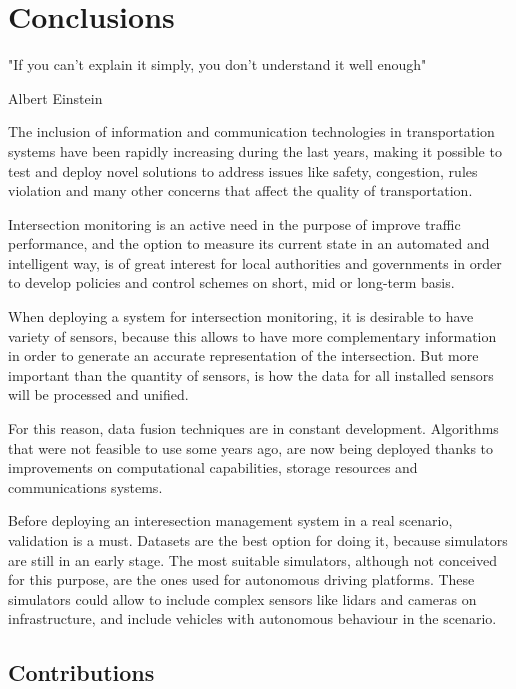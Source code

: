 \chapter[Conclusions]{Conclusions}

\epigraph{"If you can't explain it simply, you don't understand it well enough"}{Albert Einstein}

The inclusion of information and communication technologies in transportation systems have been rapidly increasing during the last years, making it possible to test and deploy novel solutions to address issues like safety, congestion, rules violation and many other concerns that affect the quality of transportation.

Intersection monitoring is an active need in the purpose of improve traffic performance, and the option to measure its current state in an automated and intelligent way, is of great interest for local authorities and governments in order to develop policies and control schemes on short, mid or long-term basis.

When deploying a system for intersection monitoring, it is desirable to have variety of sensors, because this allows to have more complementary information in order to generate an accurate representation of the intersection. But more important than the quantity of sensors, is how the data for all installed sensors will be processed and unified.

For this reason, data fusion techniques are in constant development. Algorithms that were not feasible to use some years ago, are now being deployed thanks to improvements on computational capabilities, storage resources and communications systems.

Before deploying an interesection management system in a real scenario, validation is a must. Datasets are the best option for doing it, because simulators are still in an early stage. The most suitable simulators, although not conceived for this purpose, are the ones used for autonomous driving platforms. These simulators could allow to include complex sensors like lidars and cameras on infrastructure, and include vehicles with autonomous behaviour in the scenario.


\section{Contributions}

